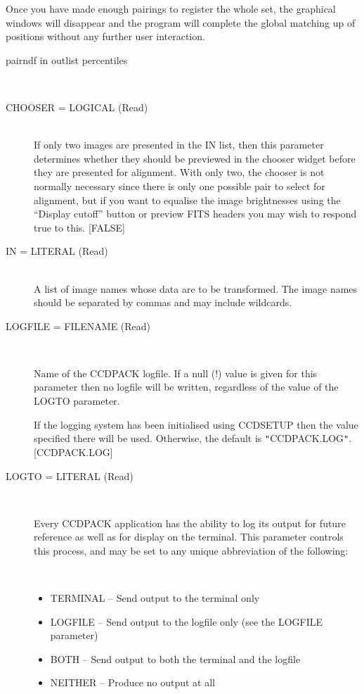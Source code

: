 \documentclass[twoside,11pt]{article}
\newcommand{\htmlref}[2]{#1}
\renewcommand{\_}{\texttt{\symbol{95}}}
\newcommand{\xroutine}[1]{\htmlref{{\sc #1}}{#1}}
\newcommand{\sstusage}[1]{\item[Usage:] \mbox{}
   \begin{description}
      {\ssttt \item #1}
   \end{description}
}
\newcommand{\sstparameters}[1]{
   \item[Parameters:] \mbox{} \\
   \vspace{-3.5ex}
   \begin{description}
      #1
   \end{description}
}
\newcommand{\sstsubsection}[1]{ \item[{#1}] \mbox{} \\}
\newcommand{\sstitemlist}[1]{
  \mbox{} \\
  \vspace{-3.5ex}
  \begin{itemize}
     #1
  \end{itemize}
}
\newcommand{\sstitem}{\item}
\newcommand{\sstusage}[1]{\item[Usage:]
      \begin{description}
         {\ssttt #1}
      \end{description}
      \\
   }
\newcommand{\sstparameters}[1]{
      \item[Parameters:] \\
      \begin{description}
         #1
      \end{description}
      \\
   }
\newcommand{\sstsubsection}[1]{\item[{#1}]}
\newcommand{\sstitemlist}[1]{
      \begin{itemize}
         #1
      \end{itemize}
      \\
   }
\newcommand{\sstitem}{\item}
\begin{document}
{{      Once you have made enough pairings to register the whole set, the
      graphical windows will disappear and the program will complete
      the global matching up of positions without any further user
      interaction.
   }
   \sstusage{
      pairndf in outlist percentiles
   }
   \sstparameters{
      \sstsubsection{
         CHOOSER = \_LOGICAL (Read)
      }{
         If only two images are presented in the IN list, then this
         parameter determines whether they should be previewed in
         the chooser widget before they are presented for alignment.
         With only two, the chooser is not normally necessary since
         there is only one possible pair to select for alignment,
         but if you want to equalise the image brightnesses using
         the ``Display cutoff'' button or preview FITS headers you
         may wish to respond true to this.
         [FALSE]
      }
      \sstsubsection{
         IN = LITERAL (Read)
      }{
         A list of image names whose data are to be transformed. The image
         names should be separated by commas and may include wildcards.
      }
      \sstsubsection{
         LOGFILE = FILENAME (Read)
      }{
         Name of the CCDPACK logfile.  If a null (!) value is given for
         this parameter then no logfile will be written, regardless of
         the value of the LOGTO parameter.

         If the logging system has been initialised using \xroutine{CCDSETUP}
         then the value specified there will be used. Otherwise, the
         default is {\tt "}CCDPACK.LOG{\tt "}.
         [CCDPACK.LOG]
      }
      \sstsubsection{
         LOGTO = LITERAL (Read)
      }{
         Every CCDPACK application has the ability to log its output
         for future reference as well as for display on the terminal.
         This parameter controls this process, and may be set to any
         unique abbreviation of the following:
         \sstitemlist{

            \sstitem
               TERMINAL  -- Send output to the terminal only

            \sstitem
               LOGFILE   -- Send output to the logfile only (see the
                               LOGFILE parameter)

            \sstitem
               BOTH      -- Send output to both the terminal and the
                               logfile

            \sstitem
               NEITHER   -- Produce no output at all

}}}}
\end{document}
